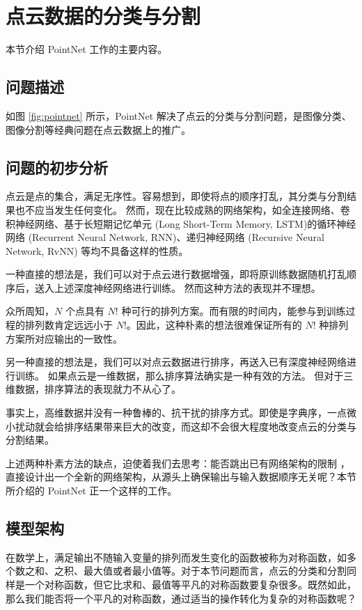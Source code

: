\section{点云数据的分类与分割\label{section:pointnet}}
本节介绍 PointNet\cite{pointnet}  工作的主要内容。

\subsection{问题描述}
如图 \ref{fig:pointnet} 所示，PointNet 解决了点云的分类与分割问题，是图像分类、图像分割等经典问题在点云数据上的推广。

\subsection{问题的初步分析}

点云是点的集合，满足无序性。容易想到，即使将点的顺序打乱，其分类与分割结果也不应当发生任何变化。
然而，现在比较成熟的网络架构，如全连接网络、卷积神经网络、基于长短期记忆单元 (Long Short-Term Memory, LSTM)的循环神经网络 (Recurrent Neural Network, RNN)、递归神经网络 (Recursive Neural Network, RvNN) 等均不具备这样的性质。

一种直接的想法是，我们可以对于点云进行数据增强，即将原训练数据随机打乱顺序后，送入上述深度神经网络进行训练。
然而这种方法的表现并不理想。

众所周知，$N$ 个点具有 $N!$ 种可行的排列方案。而有限的时间内，能参与到训练过程的排列数肯定远远小于 $N!$。因此，这种朴素的想法很难保证所有的 $N!$ 种排列方案所对应输出的一致性。

另一种直接的想法是，我们可以对点云数据进行排序，再送入已有深度神经网络进行训练。
如果点云是一维数据，那么排序算法确实是一种有效的方法。
但对于三维数据，排序算法的表现就力不从心了。

事实上，高维数据并没有一种鲁棒的、抗干扰的排序方式。即使是字典序，一点微小扰动就会给排序结果带来巨大的改变，而这却不会很大程度地改变点云的分类与分割结果。

上述两种朴素方法的缺点，迫使着我们去思考：能否跳出已有网络架构的限制%
，
直接设计出一个全新的网络架构，从源头上确保输出与输入数据顺序无关呢？本节所介绍的 PointNet 正一个这样的工作。

\subsection{模型架构}
在数学上，满足输出不随输入变量的排列而发生变化的函数被称为对称函数，如多个数之和、之积、最大值或者最小值等。对于本节问题而言，点云的分类和分割同样是一个对称函数，但它比求和、最值等平凡的对称函数要复杂很多。既然如此，那么我们能否将一个平凡的对称函数，通过适当的操作转化为复杂的对称函数呢？

